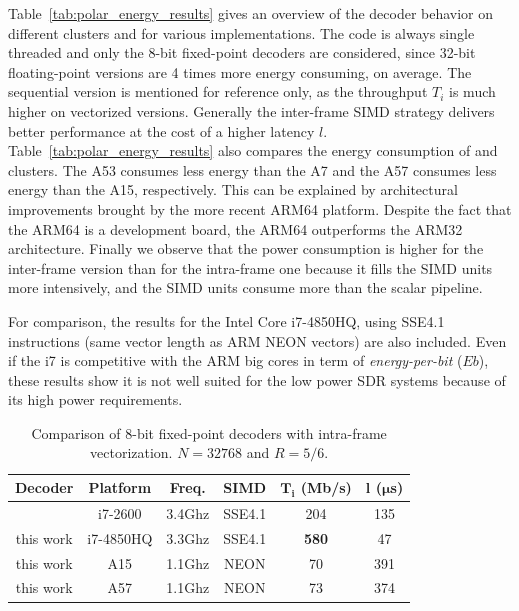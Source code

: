Table~\ref{tab:polar_energy_results} gives an overview of the decoder behavior
on different clusters and for various implementations. The code is always single
threaded and only the 8-bit fixed-point decoders are considered, since 32-bit
floating-point versions  are 4 times more energy consuming, on average. The
sequential version is mentioned for reference only, as the  throughput $T_i$ is
much higher on vectorized versions. Generally the inter-frame SIMD strategy
delivers better performance at the cost of a higher latency $l$.
Table~\ref{tab:polar_energy_results} also compares the energy consumption of
\little and \big clusters. The A53 consumes less energy than the A7 and the A57
consumes less energy than the A15, respectively. This can be explained by
architectural improvements brought by the more recent ARM64 platform. Despite
the fact that the ARM64 is a development board, the ARM64 outperforms the ARM32
architecture. Finally we observe that the power consumption is higher for the
inter-frame version than for the intra-frame one because it fills the SIMD units
more intensively, and the SIMD units consume more than the scalar pipeline.

For comparison, the results for the Intel Core i7-4850HQ, using SSE4.1
instructions (same vector length as ARM NEON vectors) are also included. Even if
the i7 is competitive with the ARM big cores in term of \textit{energy-per-bit}
($E b$), these results show it is not well suited for the low power SDR systems
because of its high power requirements.

\begin{table}
  \caption{Comparison of 8-bit fixed-point decoders with intra-frame
    vectorization. $N = 32768$ and $R = 5/6$.}
  \label{tab:polar_energy_comparison}
  \begin{center}
  \begin{tabular}{c | c | c | c | c | c}
    \textbf{Decoder} &
    \textbf{Platform} &
    \textbf{Freq.} &
    \textbf{SIMD} &
    $\boldsymbol{T_i}$ \textbf{(Mb/s)} &
    $\boldsymbol{l}$   \textbf{($\boldsymbol{\mu}$s)}\\
    \hline
    \cite{Giard2014} & i7-2600   & 3.4Ghz & SSE4.1 &         204  &  135 \\
    \hline
    this work        & i7-4850HQ & 3.3Ghz & SSE4.1 & \textbf{580} &   47 \\
    \hline
    this work        & A15       & 1.1Ghz & NEON   &          70  &  391 \\
    \hline
    this work        & A57       & 1.1Ghz & NEON   &          73  &  374 \\
  \end{tabular}
  \end{center}
\end{table}

